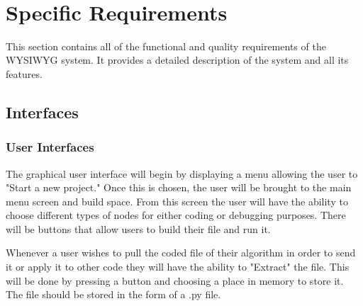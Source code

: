 \documentclass[journal,10pt,onecolumn,compsoc]{IEEEtran} \usepackage[margin=1.0in]{geometry} \usepackage{pdfpages} \usepackage{graphicx}
\begin{document}
\begin{minipage}{\textwidth}
		\\
	\end{minipage}


\newpage

\section{Specific Requirements}

This section contains all of the functional and quality requirements of the WYSIWYG system. 
It provides a detailed description of the system and all its features.


\subsection{Interfaces}
\subsubsection{User Interfaces}

The graphical user interface will begin by displaying a menu allowing the user to "Start a new project."
Once this is chosen, the user will be brought to the main menu screen and build space.
From this screen the user will have the ability to choose different types of nodes for either coding or debugging purposes.
There will be buttons that allow users to build their file and run it.

Whenever a user wishes to pull the coded file of their algorithm in order to send it or apply it to other code they will have the ability to "Extract" the file.
This will be done by pressing a button and choosing a place in memory to store it. 
The file should be stored in the form of a .py file.
\end{document}

